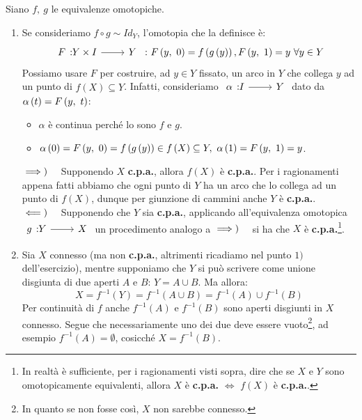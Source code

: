 \begin{demonstration} Siano $f,\ g$ le equivalenze omotopiche.
	\begin{center}
	\end{center}
	\begin{enumerate}[label=\Roman*]
		\item Se consideriamo $f\circ g\sim Id_Y$, l'omotopia che la definisce è:
		\begin{equation*}
			\funz{F}{Y\times I}{Y}\ \colon \mvf{F}{y}{0}=f\left(g\left(y\right)\right), \mvf{F}{y}{1}=y\ \forall y\in Y
		\end{equation*}
		Possiamo usare $F$ per costruire, ad $y\in Y$ fissato, un arco in $Y$ che collega $y$ ad un punto di $f\left(X\right)\subseteq Y$. Infatti, consideriamo $\funz{\alpha}{I}{Y}$ dato da $\alpha\left(t\right)=F\left(y,\ t\right)$:
\begin{itemize}
\item $\alpha$ è continua perché lo sono $f$ e $g$.
\item $\alpha\left(0\right)=\mvf{F}{y}{0}=f\left(g\left(y\right)\right)\in f\left(X\right)\subseteq Y,\ \alpha\left(1\right)=\mvf{F}{y}{1}=y$.
\end{itemize}
$\implies)\quad$ Supponendo $X$ \textbf{c.p.a.}, allora $f\left(X\right)$ è \textbf{c.p.a.}. Per i ragionamenti appena fatti abbiamo che ogni punto di $Y$ ha un arco che lo collega ad un punto di $f\left(X\right)$, dunque per giunzione di cammini anche $Y$ è \textbf{c.p.a.}.\\
$\impliedby)\quad$ Supponendo che $Y$ sia \textbf{c.p.a.}, applicando all'equivalenza omotopica $\funz{g}{Y}{X}$ un procedimento analogo a $\implies)\quad$ si ha che $X$ è \textbf{c.p.a.}\footnote{In realtà è sufficiente, per i ragionamenti visti sopra, dire che se $X$ e $Y$ sono omotopicamente equivalenti, allora $X$ è \textbf{c.p.a.} $\iff$ $f\left(X\right)$ è \textbf{c.p.a.}.}.
\item Sia $X$ connesso (ma non \textbf{c.p.a.}, altrimenti ricadiamo nel punto $1)$ dell'esercizio), mentre supponiamo che $Y$ si può scrivere come unione disgiunta di due aperti $A$ e $B$: $Y=A\cup B$.
Ma allora:
\begin{equation*}
	X=f^{-1}\left(Y\right)=f^{-1}\left(A\cup B\right)=f^{-1}\left(A\right)\cup f^{-1}\left(B\right)
\end{equation*}
Per continuità di $f$ anche $f^{-1}\left(A\right)$ e $f^{-1}\left(B\right)$ sono aperti disgiunti in $X$ connesso. Segue che necessariamente uno dei due deve essere vuoto\footnote{In quanto se non fosse così, $X$ non sarebbe connesso.}, ad esempio $f^{-1}\left(A\right)=\emptyset$, cosicché $X=f^{-1}\left(B\right)$. \\

\end{enumerate}
\end{demonstration}
